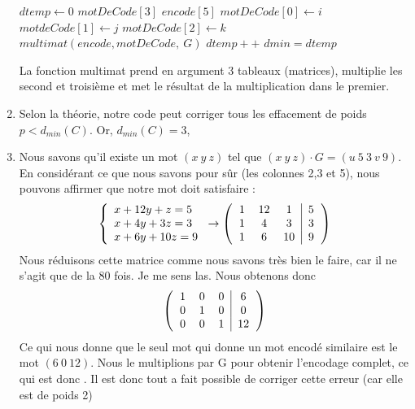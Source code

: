 \documentclass[10p,a4paper]{scrartcl}
\renewcommand{\(}{\left(}
\renewcommand{\)}{\right)}
\begin{document}
\begin{enumerate}
\begin{algorithm}[!h]
\begin{algorithmic}
					\State $dtemp \gets 0$
					\State $motDeCode[3]$
					\State $encode[5]$
					\For{($i = 0;\, i< 12;\, i++$)}
						\State $motDeCode[0] \gets i$
							\State $motdeCode[1] \gets j$
								\State $motDeCode[2] \gets k$
								\State $multimat(encode, motDeCode,\ G)$ 
										\State $dtemp++$
									\EndIf
								\EndFor
									\State $dmin = dtemp$
								\EndIf
							\EndFor
						\EndFor
					\EndFor
					\State {}
				\end{algorithmic}
			\end{algorithm}
			La fonction multimat prend en argument 3 tableaux (matrices), multiplie les second et troisième et met le résultat de la multiplication dans le premier.
	\item	Selon la théorie, notre code peut corriger tous les effacement de poids $p < d_{min}(C)$. Or, $d_{min}(C) = 3$, 
	\item	Nous savons qu'il existe un mot $(x\ y\ z)$ tel que $(x\ y\ z)\cdot G = (u\ 5\ 3\ v\ 9)$. En considérant ce que nous savons pour sûr (les colonnes 2,3 et 5), nous pouvons affirmer que notre mot doit satisfaire :
			\[\left\{
			\begin{array}{l}
			x+12y + z = 5\\
			x+4y + 3z = 3\\
			x + 6y + 10z = 9
			\end{array}\right. \to 
			\(\begin{tabular}{ccc|c}
			1 & 12 & 1 & 5\\
			1 & 4 & 3 & 3\\
			1 & 6 & 10 & 9
			\end{tabular}\)
			\]
			Nous réduisons cette matrice comme nous savons très bien le faire, car il ne s'agit que de la 80 fois. Je me sens las. Nous obtenons donc 
			\[\(\begin{tabular}{ccc|c}
				1 & 0 & 0 & 6\\
				0 & 1 & 0 & 0\\
				0 & 0 & 1 & 12
			\end{tabular}\)\]
			Ce qui nous donne que le seul mot qui donne un mot encodé similaire est le mot $(6\ 0\ 12)$. Nous le multiplions par G pour obtenir l'encodage complet, ce qui est  donc . Il est donc tout a fait possible de corriger cette erreur (car elle est de poids 2)

\end{enumerate}
\end{document}
